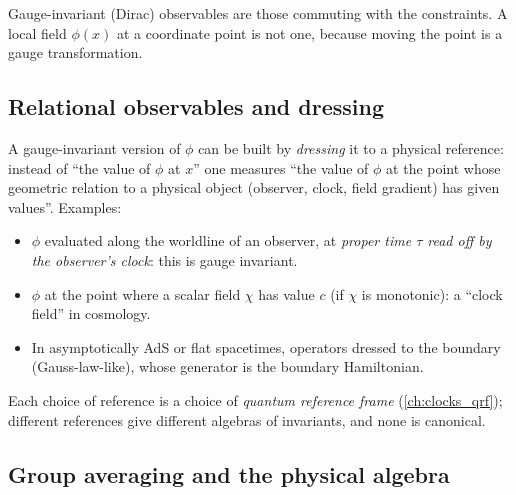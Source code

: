 \begin{keyidea}
Gauge-invariant (Dirac) observables are those commuting with the constraints. A local field $\phi(x)$ at a coordinate point is not one, because moving the point is a gauge transformation.
\end{keyidea}

\subsection{Relational observables and dressing}

A gauge-invariant version of $\phi$ can be built by \emph{dressing} it to a physical reference: instead of ``the value of $\phi$ at $x$'' one measures ``the value of $\phi$ at the point whose geometric relation to a physical object (observer, clock, field gradient) has given values''. Examples:
\begin{itemize}
\item $\phi$ evaluated along the worldline of an observer, at \emph{proper time $\tau$ read off by the observer's clock}: this is gauge invariant.
\item $\phi$ at the point where a scalar field $\chi$ has value $c$ (if $\chi$ is monotonic): a ``clock field'' in cosmology.
\item In asymptotically AdS or flat spacetimes, operators dressed to the boundary (Gauss-law-like), whose generator is the boundary Hamiltonian.
\end{itemize}
Each choice of reference is a choice of \emph{quantum reference frame} (\cref{ch:clocks_qrf}); different references give different algebras of invariants, and none is canonical.

\subsection{Group averaging and the physical algebra}

